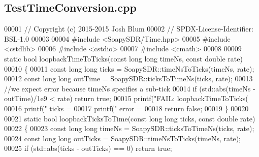 \subsection{Test\+Time\+Conversion.\+cpp}
\label{TestTimeConversion_8cpp_source}

\begin{DoxyCode}
00001 \textcolor{comment}{// Copyright (c) 2015-2015 Josh Blum}
00002 \textcolor{comment}{// SPDX-License-Identifier: BSL-1.0}
00003 
00004 \textcolor{preprocessor}{#include <SoapySDR/Time.hpp>}
00005 \textcolor{preprocessor}{#include <cstdlib>}
00006 \textcolor{preprocessor}{#include <cstdio>}
00007 \textcolor{preprocessor}{#include <cmath>}
00008 
00009 \textcolor{keyword}{static} \textcolor{keywordtype}{bool} loopbackTimeToTicks(\textcolor{keyword}{const} \textcolor{keywordtype}{long} \textcolor{keywordtype}{long} timeNs, \textcolor{keyword}{const} \textcolor{keywordtype}{double} rate)
00010 \{
00011     \textcolor{keyword}{const} \textcolor{keywordtype}{long} \textcolor{keywordtype}{long} ticks = SoapySDR::timeNsToTicks(timeNs, rate);
00012     \textcolor{keyword}{const} \textcolor{keywordtype}{long} \textcolor{keywordtype}{long} outTime = SoapySDR::ticksToTimeNs(ticks, rate);
00013     \textcolor{comment}{//we expect error because timeNs specifies a sub-tick}
00014     \textcolor{keywordflow}{if} (std::abs(timeNs - outTime)/1e9 < rate) \textcolor{keywordflow}{return} \textcolor{keyword}{true};
00015     printf(\textcolor{stringliteral}{"FAIL: loopbackTimeToTicks(%
00016     printf(\textcolor{stringliteral}{"    ticks = %
00017     printf(\textcolor{stringliteral}{"    error = %
00018     \textcolor{keywordflow}{return} \textcolor{keyword}{false};
00019 \}
00020 
00021 \textcolor{keyword}{static} \textcolor{keywordtype}{bool} loopbackTicksToTime(\textcolor{keyword}{const} \textcolor{keywordtype}{long} \textcolor{keywordtype}{long} ticks, \textcolor{keyword}{const} \textcolor{keywordtype}{double} rate)
00022 \{
00023     \textcolor{keyword}{const} \textcolor{keywordtype}{long} \textcolor{keywordtype}{long} timeNs = SoapySDR::ticksToTimeNs(ticks, rate);
00024     \textcolor{keyword}{const} \textcolor{keywordtype}{long} \textcolor{keywordtype}{long} outTicks = SoapySDR::timeNsToTicks(timeNs, rate);
00025     \textcolor{keywordflow}{if} (std::abs(ticks - outTicks) == 0) \textcolor{keywordflow}{return} \textcolor{keyword}{true};
}}}
\end{DoxyCode}

